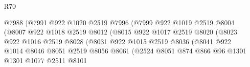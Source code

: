\begin{lexlean}{R70}
\begin{coremodule}
                                      @7988
                                      (@7991
                                        @922
                                        @1020
                                        @2519
                                        @7996
                                        (@7999
                                          @922
                                          @1019
                                          @2519
                                          @8004
                                          (@8007
                                            @922
                                            @1018
                                            @2519
                                            @8012
                                            (@8015
                                              @922
                                              @1017
                                              @2519
                                              @8020
                                              (@8023
                                                @922
                                                @1016
                                                @2519
                                                @8028
                                                (@8031
                                                  @922
                                                  @1015
                                                  @2519
                                                  @8036
                                                  (@8041
                                                    @922
                                                    @1014
                                                    @8046
                                                    @8051
                                                    @2519
                                                    @8056
                                                    @8061
                                                    (@2524
                                                      @8051
                                                      @874
                                                      @866
                                                      @96
                                                      @1301
                                                      @1301
                                                      @1077
                                                      @2511
                                                      @8101

\end{coremodule}
\end{lexlean}
